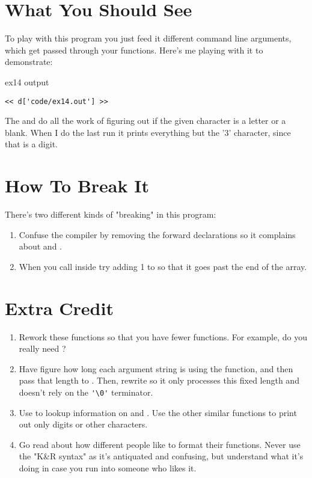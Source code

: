 \section{What You Should See}

To play with this program you just feed it different command line 
arguments, which get passed through your functions.  Here's me
playing with it to demonstrate:

\begin{code}{ex14 output}
\begin{lstlisting}
<< d['code/ex14.out'] >>
\end{lstlisting}
\end{code}

The  and  do all the work of figuring
out if the given character is a letter or a blank.  When I do the
last run it prints everything but the '3' character, since that 
is a digit.

\section{How To Break It}

There's two different kinds of "breaking" in this program:

\begin{enumerate}
\item Confuse the compiler by removing the forward declarations
    so it complains about  and .
\item When you call  inside  try
    adding 1 to  so that it goes past the end of the
     array.
\end{enumerate}


\section{Extra Credit}

\begin{enumerate}
\item Rework these functions so that you have fewer functions.  For example,
    do you really need ?
\item Have  figure how long each argument string
    is using the  function, and then pass that length
    to .  Then, rewrite  
    so it only processes this fixed length and doesn't rely on the
    \verb|'\0'| terminator.
\item Use  to lookup information on 
    and .  Use the other similar functions to
    print out only digits or other characters.
\item Go read about how different people like to format their
    functions.  Never use the "K\&R syntax" as it's antiquated and
    confusing, but understand what it's doing in case you run
    into someone who likes it.
\end{enumerate}

